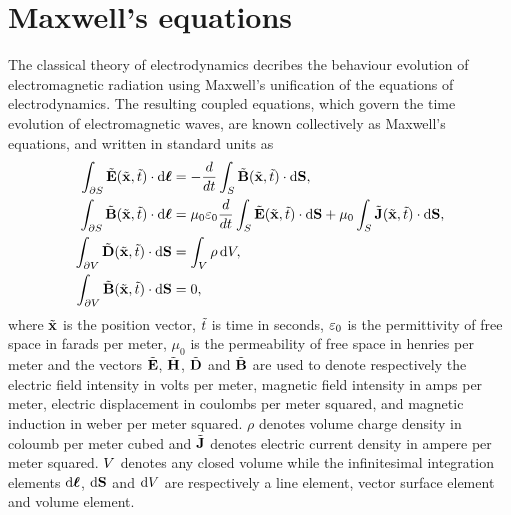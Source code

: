 \section{Maxwell's equations}
The classical theory of electrodynamics decribes the behaviour evolution of
electromagnetic radiation using Maxwell's unification of the equations of
electrodynamics\cite{Balanis:ui,Jackson:490457}. The resulting coupled
equations, which govern the time evolution of electromagnetic waves, are known
collectively as Maxwell's equations, and written in standard units as
\begin{subequations}
  \begin{align}
    \int_{\partial S} \tilde{\mathbf{E}}(\tilde{\mathbf{x}},\tilde{t}) \cdot \mathrm{d}\boldsymbol{\ell}  &= - \frac{d}{dt} \int_{S} \tilde{\mathbf{B}}(\tilde{\mathbf{x}},\tilde{t}) \cdot \mathrm{d}\mathbf{S}, \label{eq:maxwell-faraday-integral} \\
    \int_{\partial S} \tilde{\mathbf{B}}(\tilde{\mathbf{x}},\tilde{t}) \cdot \mathrm{d}\boldsymbol{\ell} &= \mu_0 \varepsilon_0 \frac{d}{dt} \int_{S} \tilde{\mathbf{E}}(\tilde{\mathbf{x}},\tilde{t}) \cdot \mathrm{d}\mathbf{S} +  \mu_0 \int_{S} \tilde{\mathbf{J}}(\tilde{\mathbf{x}},\tilde{t}) \cdot \mathrm{d}\mathbf{S}, \label{eq:maxwell-ampere-integral} \\
    \int_{\partial V} \tilde{\mathbf{D}}(\tilde{\mathbf{x}},\tilde{t})\cdot\mathrm{d}\mathbf{S} &= \int_V \rho \,\mathrm{d}V, \label{eq:maxwell-gauss-integral} \\
    \int_{\partial V} \tilde{\mathbf{B}}(\tilde{\mathbf{x}},\tilde{t})\cdot\mathrm{d}\mathbf{S} &= 0, \label{eq:maxwell-gauss-magnetism-integral}
  \end{align}
\end{subequations}
where $\tilde{\mathbf{x}}$ is the position vector, $\tilde{t}$ is time in seconds, $\varepsilon_0$
is the permittivity of free space in farads per meter, $\mu_0$ is the
permeability of free space in henries per meter and the vectors $\tilde{\mathbf{E}}$,
$\tilde{\mathbf{H}}$, $\tilde{\mathbf{D}}$ and $\tilde{\mathbf{B}}$ are used to denote respectively the electric
field intensity in volts per meter, magnetic field intensity in amps per meter,
electric displacement in coulombs per meter squared, and magnetic induction in
weber per meter squared. $\rho$ denotes volume charge density in coloumb per
meter cubed and $\tilde{\mathbf{J}}$ denotes electric current density in ampere per meter
squared.
$V$ denotes any closed volume while the infinitesimal integration elements
$\mathrm{d}\boldsymbol{\ell}$, $\mathrm{d}\mathbf{S}$ and $\mathrm{d}V$ are respectively a line element, vector surface
element and volume element.
